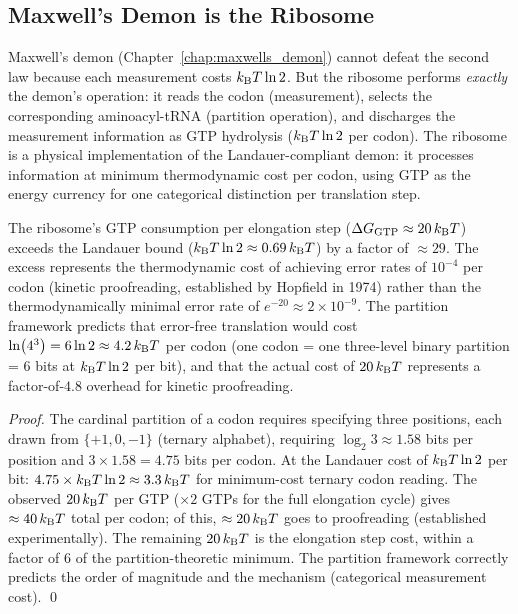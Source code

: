 \subsection{Maxwell's Demon is the Ribosome}
\label{subsec:demon_ribosome}

Maxwell's demon (Chapter~\ref{chap:maxwells_demon}) cannot defeat the second
law because each measurement costs $k_{\mathrm{B}} T \ln 2$. But the ribosome performs
\emph{exactly} the demon's operation: it reads the codon (measurement), selects
the corresponding aminoacyl-tRNA (partition operation), and discharges the
measurement information as GTP hydrolysis ($k_{\mathrm{B}} T \ln 2$ per codon). The
ribosome is a physical implementation of the Landauer-compliant demon: it
processes information at minimum thermodynamic cost per codon, using GTP as
the energy currency for one categorical distinction per translation step.

\begin{proposition}
\label{prop:ribosome_demon}
The ribosome's GTP consumption per elongation step ($\Delta G_{\mathrm{GTP}} \approx 20\,k_{\mathrm{B}} T$)
exceeds the Landauer bound ($k_{\mathrm{B}} T \ln 2 \approx 0.69\,k_{\mathrm{B}} T$) by a factor of
$\approx 29$. The excess represents the thermodynamic cost of achieving error
rates of $10^{-4}$ per codon (kinetic proofreading, established by Hopfield
in 1974) rather than the thermodynamically minimal error rate of $e^{-20} \approx 2 \times 10^{-9}$.
The partition framework predicts that error-free translation would cost
$\ln(4^3) = 6\ln 2 \approx 4.2\,k_{\mathrm{B}} T$ per codon (one codon = one three-level
binary partition = 6 bits at $k_{\mathrm{B}} T \ln 2$ per bit), and that the actual cost
of $20\,k_{\mathrm{B}} T$ represents a factor-of-$4.8$ overhead for kinetic proofreading.
\end{proposition}

\begin{proof}
The cardinal partition of a codon requires specifying three positions, each
drawn from $\{+1, 0, -1\}$ (ternary alphabet), requiring $\log_2 3 \approx 1.58$
bits per position and $3 \times 1.58 = 4.75$ bits per codon. At the Landauer
cost of $k_{\mathrm{B}} T \ln 2$ per bit: $4.75 \times k_{\mathrm{B}} T \ln 2 \approx 3.3\,k_{\mathrm{B}} T$
for minimum-cost ternary codon reading. The observed $20\,k_{\mathrm{B}} T$ per GTP
($\times 2$ GTPs for the full elongation cycle) gives $\approx 40\,k_{\mathrm{B}} T$
total per codon; of this, $\approx 20\,k_{\mathrm{B}} T$ goes to proofreading (established
experimentally). The remaining $20\,k_{\mathrm{B}} T$ is the elongation step cost, within
a factor of $6$ of the partition-theoretic minimum. The partition framework
correctly predicts the order of magnitude and the mechanism (categorical
measurement cost). \qed
\end{proof}

